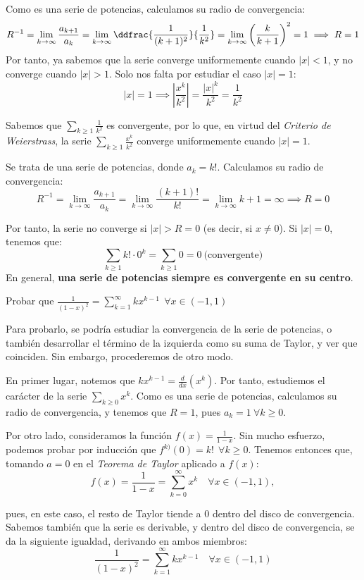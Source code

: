   \begin{sol}[d]
    Como es una serie de potencias, calculamos su radio de convergencia: $$R^{-1} = \lim_{k\to\infty} \frac{a_{k+1}}{a_k} = \lim_{k\to\infty} \ddfrac{\frac{1}{(k+1)^2}}{\frac{1}{k^2}} = \lim_{k\to\infty} \left(\frac{k}{k+1}\right)^2 = 1 \implies R = 1$$
    Por tanto, ya sabemos que la serie converge uniformemente cuando $|x| < 1$, y no converge cuando $|x| > 1$. Solo nos falta por estudiar el caso $|x|=1$: $$|x| = 1 \implies \left| \frac{x^k}{k^2} \right| = \frac{|x|^k}{k^2} = \frac{1}{k^2}$$

    Sabemos que $\displaystyle \sum_{k\ge1} \frac{1}{k^2}$ es convergente, por lo que, en virtud del \textit{Criterio de Weierstrass}, la serie $\displaystyle \sum_{k\ge1}\frac{x^k}{k^2}$ converge uniformemente cuando $|x| = 1$.
  \end{sol}

 \begin{sol}[e]
    Se trata de una serie de potencias, donde $a_k = k!$. Calculamos su radio de convergencia: $$R^{-1} = \lim_{k\to\infty} \frac{a_{k+1}}{a_k} = \lim_{k\to\infty} \frac{(k+1)!}{k!} = \lim_{k\to\infty} k + 1 = \infty \implies R=0$$

    Por tanto, la serie no converge si $|x| > R = 0$ (es decir, si $x\ne 0$). Si $|x| = 0$, tenemos que: $$\sum_{k\ge1} k! \cdot0^k = \sum_{k\ge1} 0 = 0 \ \text{(convergente)}$$
    En general, \textbf{una serie de potencias siempre es convergente en su centro}.
  \end{sol}


\begin{ejer}
  Probar que $\displaystyle \frac{1}{(1-x)^2} = \sum_{k=1}^\infty kx^{k-1}\ \ \forall x \in (-1,1)$
\end{ejer}

 \begin{sol}
    Para probarlo, se podría estudiar la convergencia de la serie de potencias, o también desarrollar el término de la izquierda como su suma de Taylor, y ver que coinciden. Sin embargo, procederemos de otro modo.

    En primer lugar, notemos que $\displaystyle kx^{k-1} = \frac{d}{dx}(x^k)$. Por tanto, estudiemos el carácter de la serie $\displaystyle \sum_{k\ge0} x^k$. Como es una serie de potencias, calculamos su radio de convergencia, y tenemos que $R = 1$, pues $a_k=1 \ \forall k \ge 0$.

    Por otro lado, consideramos la función $\displaystyle f(x) = \frac{1}{1-x}$. Sin mucho esfuerzo, podemos probar por inducción que $f^{k)}(0) = k! \ \ \forall k \ge 0$. Tenemos entonces que, tomando $a=0$ en el \textit{Teorema de Taylor} aplicado a $f(x)$: $$f(x) = \frac{1}{1-x} = \sum_{k=0}^\infty x^k \quad \forall x \in (-1,1),$$

    pues, en este caso, el resto de Taylor tiende a $0$ dentro del disco de convergencia. Sabemos también que la serie es derivable, y dentro del disco de convergencia, se da la siguiente igualdad, derivando en ambos miembros: $$\frac{1}{(1-x)^2} = \sum_{k=1}^\infty kx^{k-1}\quad \forall x \in (-1,1)$$
  \end{sol}

